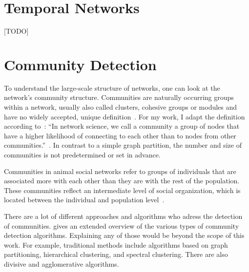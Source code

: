 \section{Temporal Networks}
[TODO]

\section{Community Detection}
To understand the large-scale structure of networks, one can look at the network's community structure. Communities are naturally occurring groups within a network, usually also called clusters, cohesive groups or modules and have no widely accepted, unique definition~\cite{palla2005uncovering}.
For my work, I adapt the definition according to~\textcite{barabasi2016network}: 
``In network science, we call a community a group of nodes that have a higher likelihood of connecting to each other than to nodes from other communities.''~\cite[p.~TODO]{barabasi2016network}. In contrast to a simple graph partition, the number and size of communities is not predetermined or set in advance.

Communities in animal social networks refer to groups of individuals that are associated more with each other than they are with the rest of the population. These communities reflect an intermediate level of social organization, which is located between the individual and population level~\cite{croft2008exploring}.

There are a lot of different approaches and algorithms who adress the detection of communities. \textcite{fortunato2010community} gives an extended overview of the various types of community detection algorithms.
Explaining any of those would be beyond the scope of this work. For example, traditional methods include algorithms based on graph partitioning, hierarchical clustering, and spectral clustering. There are also divisive and agglomerative algorithms.

